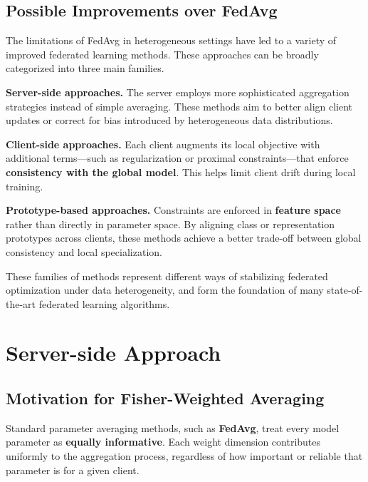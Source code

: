 \subsection{Possible Improvements over FedAvg}

The limitations of FedAvg in heterogeneous settings have led to a variety of improved
federated learning methods. These approaches can be broadly categorized into three main
families.

\begin{compactitemize}
    \item \textbf{Server-side approaches.}  
    The server employs more sophisticated aggregation strategies instead of simple averaging.
    These methods aim to better align client updates or correct for bias introduced by
    heterogeneous data distributions.

    \item \textbf{Client-side approaches.}  
    Each client augments its local objective with additional terms—such as regularization or
    proximal constraints—that enforce \textbf{consistency with the global model}. This helps
    limit client drift during local training.

    \item \textbf{Prototype-based approaches.}  
    Constraints are enforced in \textbf{feature space} rather than directly in parameter
    space. By aligning class or representation prototypes across clients, these methods
    achieve a better trade-off between global consistency and local specialization.
\end{compactitemize}

These families of methods represent different ways of stabilizing federated optimization
under data heterogeneity, and form the foundation of many state-of-the-art federated
learning algorithms.

\section{Server-side Approach}

\subsection{Motivation for Fisher-Weighted Averaging}

Standard parameter averaging methods, such as \textbf{FedAvg}, treat every model parameter
as \textbf{equally informative}. Each weight dimension contributes uniformly to the
aggregation process, regardless of how important or reliable that parameter is for a
given client.

